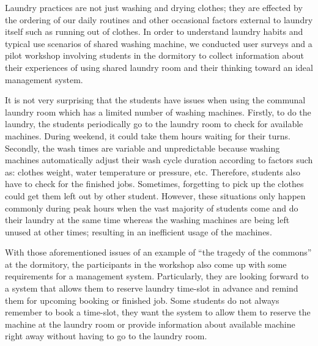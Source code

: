 Laundry practices are not just washing and drying clothes; they are effected by the ordering of
our daily routines \cite{shove2010beyond} and other occasional factors external to laundry itself such as running out of clothes. In order to understand laundry habits and typical use scenarios of shared washing machine, we conducted user surveys and a pilot workshop involving students in the dormitory to collect information about their experiences of using shared laundry room and their thinking toward an ideal management system.

It is not very surprising that the students have issues when using the communal laundry room which has a limited number of washing machines. Firstly, to do the laundry, the students periodically go to the laundry room to check for available machines. During weekend, it could take them hours waiting for their turns. Secondly, the wash times are variable and unpredictable because washing machines automatically adjust their wash cycle duration according to factors such as: clothes weight, water temperature or pressure, etc. Therefore, students also have to check for the finished jobs. Sometimes, forgetting to pick up the clothes could get them left out by other student. However, these situations only happen commonly during peak hours when the vast majority of students come and do their laundry at the same time whereas the washing machines are being left unused at other times; resulting in an inefficient usage of the machines.

With those aforementioned issues of an example of ``the tragedy of the commons'' at the dormitory, the participants in the workshop also come up with some requirements for a management system. Particularly, they are looking forward to a system that allows them to reserve laundry time-slot in advance and remind them for upcoming booking or finished job. Some students do not always remember to book a time-slot, they want the system to allow them to reserve the machine at the laundry room or provide information about available machine right away without having to go to the laundry room.